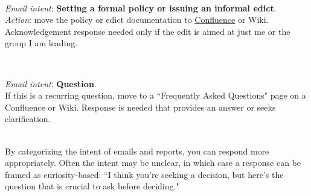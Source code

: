 \ \\
\begin{samepage}
\textit{Email intent}: \textbf{Setting a formal policy or issuing an informal edict}.\\
\textit{Action}: move the policy or edict documentation to \href{https://en.wikipedia.org/wiki/Confluence_(software)}{Confluence}
or Wiki.
\iftoggle{WPinmargin}{\marginpar{$>$Wikipedia: Confluence}}{}%
Acknowledgement response needed only if the edit is aimed at just me or the group I am leading.
\end{samepage}

\ \\
\begin{samepage}
\textit{Email intent}: \textbf{Question}.\\
If this is a recurring question, move to a ``Frequently Asked Questions" page on a Confluence or Wiki.
Response is needed that provides an answer or seeks clarification.
\end{samepage}

\ \\

By categorizing the intent of emails and reports, you can respond more appropriately. Often the intent may be unclear, in which case a response can be framed as curiosity-based: ``I think you're seeking a decision, but here's the question that is crucial to ask before deciding."

\ \\

